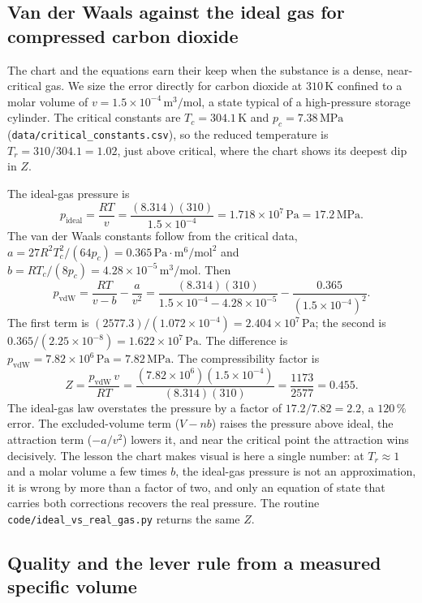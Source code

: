 \subsection{Van der Waals against the ideal gas for compressed carbon
dioxide}

The chart and the equations earn their keep when the substance is a
dense, near-critical gas. We size the error directly for carbon dioxide
at $310\,\si{\kelvin}$ confined to a molar volume of $v = 1.5\times
10^{-4}\,\text{m}^3/\text{mol}$, a state typical of a high-pressure
storage cylinder. The critical constants are $T_c = 304.1\,\si{\kelvin}$
and $p_c = 7.38\,\text{MPa}$ (\texttt{data/critical\_constants.csv}), so
the reduced temperature is $T_r = 310/304.1 = 1.02$, just above critical,
where the chart shows its deepest dip in $Z$.

The ideal-gas pressure is
\[
p_{\text{ideal}} = \frac{RT}{v} = \frac{(8.314)(310)}{1.5\times 10^{-4}}
= 1.718\times 10^7\,\text{Pa} = 17.2\,\text{MPa}.
\]
The van der Waals constants follow from the critical data,
$a = 27 R^2 T_c^2/(64 p_c) = 0.365\,\text{Pa}\cdot\text{m}^6/\text{mol}^2$
and $b = R T_c/(8 p_c) = 4.28\times 10^{-5}\,\text{m}^3/\text{mol}$. Then
\[
p_{\text{vdW}} = \frac{RT}{v - b} - \frac{a}{v^2}
= \frac{(8.314)(310)}{1.5\times 10^{-4} - 4.28\times 10^{-5}}
- \frac{0.365}{(1.5\times 10^{-4})^2}.
\]
The first term is $(2577.3)/(1.072\times 10^{-4}) = 2.404\times 10^7\,
\text{Pa}$; the second is $0.365/(2.25\times 10^{-8}) = 1.622\times 10^7\,
\text{Pa}$. The difference is $p_{\text{vdW}} = 7.82\times 10^6\,\text{Pa}
= 7.82\,\text{MPa}$. The compressibility factor is
\[
Z = \frac{p_{\text{vdW}}\, v}{RT} = \frac{(7.82\times 10^6)(1.5\times
10^{-4})}{(8.314)(310)} = \frac{1173}{2577} = 0.455.
\]
The ideal-gas law overstates the pressure by a factor of $17.2/7.82 =
2.2$, a $120\,\%$ error. The excluded-volume term ($V - nb$) raises the
pressure above ideal, the attraction term ($-a/v^2$) lowers it, and near
the critical point the attraction wins decisively. The lesson the chart
makes visual is here a single number: at $T_r \approx 1$ and a molar
volume a few times $b$, the ideal-gas pressure is not an approximation,
it is wrong by more than a factor of two, and only an equation of state
that carries both corrections recovers the real pressure. The routine
\texttt{code/ideal\_vs\_real\_gas.py} returns the same $Z$.

\subsection{Quality and the lever rule from a measured specific volume}

